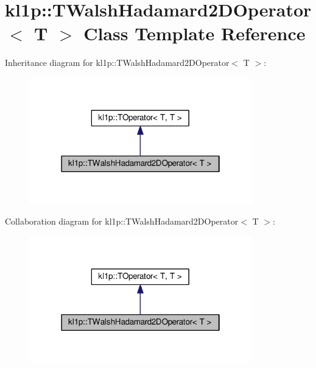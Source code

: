 \hypertarget{classkl1p_1_1TWalshHadamard2DOperator}{}\section{kl1p\+:\+:T\+Walsh\+Hadamard2\+D\+Operator$<$ T $>$ Class Template Reference}
\label{classkl1p_1_1TWalshHadamard2DOperator}


Inheritance diagram for kl1p\+:\+:T\+Walsh\+Hadamard2\+D\+Operator$<$ T $>$\+:
\nopagebreak
\begin{figure}[H]
\begin{center}
\leavevmode
\includegraphics[width=274pt]{classkl1p_1_1TWalshHadamard2DOperator__inherit__graph}
\end{center}
\end{figure}


Collaboration diagram for kl1p\+:\+:T\+Walsh\+Hadamard2\+D\+Operator$<$ T $>$\+:
\nopagebreak
\begin{figure}[H]
\begin{center}
\leavevmode
\includegraphics[width=274pt]{classkl1p_1_1TWalshHadamard2DOperator__coll__graph}
\end{center}
\end{figure}
